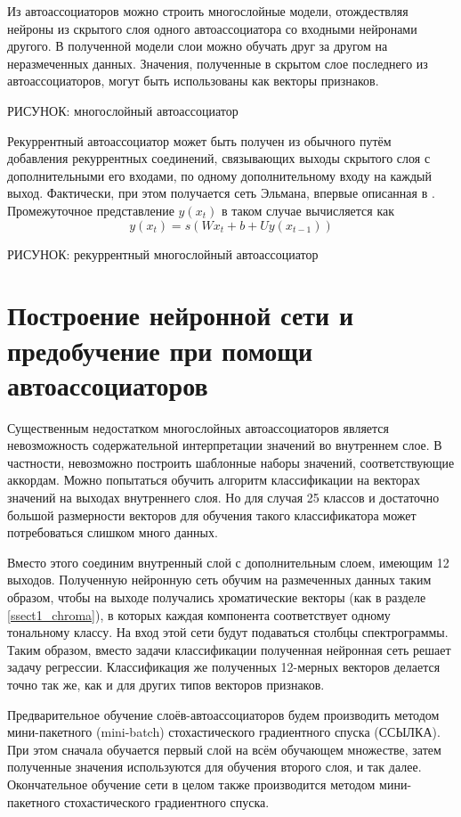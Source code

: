 Из автоассоциаторов можно строить многослойные модели, отождествляя нейроны из
скрытого слоя одного автоассоциатора со входными нейронами другого. В
полученной модели слои можно обучать друг за другом на неразмеченных данных.
Значения, полученные в скрытом слое последнего из автоассоциаторов, могут быть
использованы как векторы признаков.

РИСУНОК: многослойный автоассоциатор

Рекуррентный автоассоциатор может быть получен из обычного путём добавления
рекуррентных соединений, связывающих выходы скрытого слоя с дополнительными его
входами, по одному дополнительному входу на каждый выход. Фактически, при этом
получается сеть Эльмана, впервые описанная в \cite{Elman1990}. Промежуточное
представление $y(x_t)$ в таком случае вычисляется как
\begin{equation}
y(x_t) = s(Wx_t + b + Uy(x_{t-1}))
\end{equation}

РИСУНОК: рекуррентный многослойный автоассоциатор

\section{Построение нейронной сети и предобучение при помощи автоассоциаторов}
\label{sect2_sda}

Существенным недостатком многослойных автоассоциаторов является невозможность
содержательной интерпретации значений во внутреннем слое. В частности,
невозможно построить шаблонные наборы значений, соответствующие аккордам. Можно
попытаться обучить алгоритм классификации на векторах значений на выходах
внутреннего слоя. Но для случая 25 классов и достаточно большой размерности
векторов для обучения такого классификатора может потребоваться слишком много
данных.

Вместо этого соединим внутренный слой с дополнительным слоем, имеющим 12
выходов. Полученную нейронную сеть обучим на размеченных данных таким образом,
чтобы на выходе получались хроматические векторы (как в разделе
\ref{ssect1_chroma}), в которых каждая компонента соответствует одному
тональному классу. На вход этой сети будут подаваться столбцы спектрограммы.
Таким образом, вместо задачи классификации полученная нейронная сеть решает
задачу регрессии. Классификация же полученных 12-мерных векторов делается точно
так же, как и для других типов векторов признаков.

Предварительное обучение слоёв-автоассоциаторов будем производить методом
мини-пакетного (mini-batch) стохастического градиентного спуска (ССЫЛКА). При
этом сначала обучается первый слой на всём обучающем множестве, затем
полученные значения используются для обучения второго слоя, и так далее.
Окончательное обучение сети в целом также производится методом мини-пакетного
стохастического градиентного спуска.

